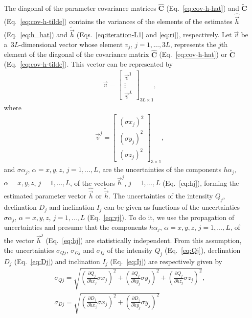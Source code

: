 \documentclass[journal abbreviation, npg]{copernicus}
\begin{document}
The diagonal of the parameter covariance matrices $\hat{\mathbf{C}}$
(Eq.~\ref{eq:cov-h-hat}) and $\tilde{\mathbf{C}}$ (Eq.~\ref{eq:cov-h-tilde})
contains the variances of the elements of the estimates $\hat{\vec{h}}$
(Eq.~\ref{eq:h_hat}) and $\tilde{\vec{h}}$ (Eqs.~\ref{eq:iteration-L1} and
\ref{eq:ri}), respectively. Let $\vec{v}$ be a~$3L$-dimensional vector whose
element $v_{j}$, $j = 1, \ldots, 3L$, represents the $j$th element of the
diagonal of the covariance matrix $\hat{\mathbf{C}}$ (Eq.~\ref{eq:cov-h-hat})
or $\tilde{\mathbf{C}}$ (Eq.~\ref{eq:cov-h-tilde}). This vector can be
represented by
\begin{align}
 &
\vec{v} =
\begin{bmatrix}
\vec{v}^{1} \\
\vdots \\
\vec{v}^{L}
\end{bmatrix}
_{3L \times 1} ,
\label{eq:v}
\end{align}
where
\begin{align}
 &
\vec{v}^{j} =
\begin{bmatrix}
\left(\sigma x_{j} \right)^{2} \\
\left(\sigma y_{j} \right)^{2} \\
\left(\sigma z_{j} \right)^{2}
\end{bmatrix}
_{3 \times 1} ,
\label{eq:vj}
\end{align}
and ${\sigma \alpha}_{j}$, $\alpha = x, y, z$, $j = 1, \ldots, L$, are the
uncertainties of the components ${h \alpha}_{j}$, $\alpha = x, y, z$, $j = 1,
\ldots, L$, of the vectors $\vec{h}^{j}$, $j = 1, \ldots, L$
(Eq.~\ref{eq:hj}), forming the estimated parameter vector $\hat{\vec{h}}$ or
$\tilde{\vec{h}}$. The uncertainties of the intensity $Q_{j}$, declination
$D_{j}$ and inclination $I_{j}$ can be given as functions of the
uncertainties ${\sigma \alpha}_{j}$, $\alpha = x, y, z$, $j = 1, \ldots, L$
(Eq.~\ref{eq:vj}). To do it, we use the propagation of uncertainties
\citep{fornasini2008} and presume that the components ${h \alpha}_{j}$,
$\alpha = x, y, z$, $j = 1, \ldots, L$, of the vector $\vec{h}^{j}$
(Eq.~\ref{eq:hj}) are statistically independent. From this assumption, the
uncertainties $\sigma_{Qj}$, $\sigma_{Dj}$ and $\sigma_{Ij}$ of the intensity
$Q_{j}$ (Eq.~\ref{eq:Qj}), declination $D_{j}$ (Eq.~\ref{eq:Dj}) and
inclination $I_{j}$ (Eq.~\ref{eq:Ij}) are respectively given by
\begin{align}
 &
\sigma_{Qj} = \sqrt{\left(\frac{\partial Q_{j}}{\partial hx_{j}}  \sigma x_{j} \right)^{2} +
                    \left(\frac{\partial Q_{j}}{\partial hy_{j}}  \sigma y_{j} \right)^{2} +
                    \left(\frac{\partial Q_{j}}{\partial hz_{j}}  \sigma z_{j} \right)^{2}} ,
\label{eq:sigmaQj}
\\
&
\sigma_{Dj} = \sqrt{\left(\frac{\partial D_{j}}{\partial hx_{j}}  \sigma x_{j} \right)^{2} +
                    \left(\frac{\partial D_{j}}{\partial hy_{j}}  \sigma y_{j} \right)^{2}}
\label{eq:sigmaDj}
\end{align}
\end{document}
